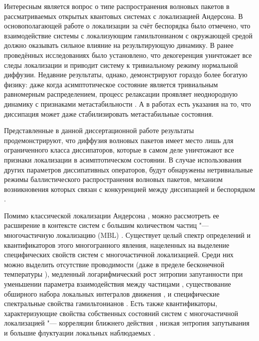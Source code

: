 Интересным является вопрос о типе распространения волновых пакетов в рассматриваемых открытых квантовых системах с локализацией Андерсона.
В основополагающей работе о локализации за счёт беспорядка \autocite{Anderson1958} было отмечено, что взаимодействие системы с локализующим гамильтонианом с окружающей средой должно оказывать сильное влияние на результирующую динамику. 
В ранее проведённых исследованиях \autocite{Gurvitz2000, Nowak2012, Flores1999} было установлено, что декогеренция уничтожает все следы локализации и приводит систему к тривиальному режиму нормальной диффузии.
Недавние результаты, однако, демонстрируют гораздо более богатую физику: даже когда асимптотическое состояние является тривиальным равномерным распределением, процесс релаксации проявляет неоднородную динамику с признаками метастабильности \autocite{Genway2014}. А в работах \autocite{Valenti2015, Spagnolo2015, Spagnolo2016} есть указания на то, что диссипация может даже стабилизировать метастабильные состояния.

Представленные в данной диссертационной работе результаты продемонстрируют, что диффузия волновых пакетов имеет место лишь для ограниченного класса диссипаторов, которые в самом деле уничтожают все признаки локализации в асимптотическом состоянии.
В случае использования других параметров диссипативных операторов, будут обнаружены нетривиальные режимы баллистического распространения волновых пакетов, механизм возникновения которых связан с конкуренцией между
диссипацией и беспорядком \cite{Yusipov2018}.

Помимо классической локализации Андерсона \autocite{Anderson1958}, можно рассмотреть ее расширение в контексте систем с большим количеством частиц "--- многочастичную локализацию (MBL) \autocite{Gornyi2005, Basko2006}.
Существует целый спектр определений и квантификаторов этого многогранного явления, нацеленных на выделение специфических свойств систем с многочастичной локализацией.
Среди них можно выделить отсутствие проводимости \autocite{Gornyi2005} (даже в пределе бесконечной температуры \autocite{Basko2006}), медленный логарифмический рост энтропии запутанности при уменьшении параметра взаимодействия между частицами \autocite{Chiara2006, Znidaric2008, Bardarson2012, Serbyn2013_1}, существование обширного набора локальных интегралов движения \autocite{Serbyn2013_2}, и специфические спектральные свойства гамильтонианов \autocite{Oganesyan2007, Serbyn2016}.
Есть также квантификаторы, характеризующие свойства собственных состояний систем с многочастичной локализацией "--- корреляции ближнего действия \autocite{Pal2010}, низкая энтропия запутывания \autocite{Bauer2013, Kjll2014, Khemani2017} и большие флуктуации локальных наблюдаемых \autocite{Bera2015}.

